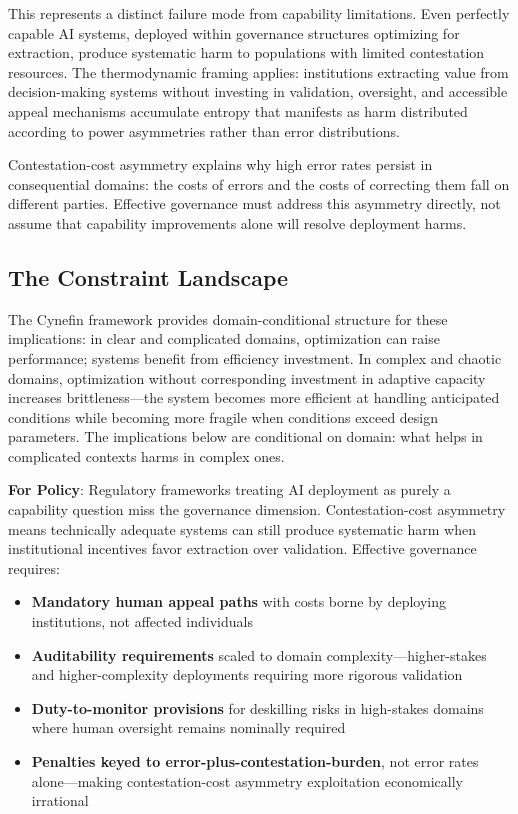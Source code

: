 This represents a distinct failure mode from capability limitations. Even perfectly capable AI systems, deployed within governance structures optimizing for extraction, produce systematic harm to populations with limited contestation resources. The thermodynamic framing applies: institutions extracting value from decision-making systems without investing in validation, oversight, and accessible appeal mechanisms accumulate entropy that manifests as harm distributed according to power asymmetries rather than error distributions.

Contestation-cost asymmetry explains why high error rates persist in consequential domains: the costs of errors and the costs of correcting them fall on different parties. Effective governance must address this asymmetry directly, not assume that capability improvements alone will resolve deployment harms.

\subsection{The Constraint Landscape}

The Cynefin framework provides domain-conditional structure for these implications: in clear and complicated domains, optimization can raise performance; systems benefit from efficiency investment. In complex and chaotic domains, optimization without corresponding investment in adaptive capacity increases brittleness—the system becomes more efficient at handling anticipated conditions while becoming more fragile when conditions exceed design parameters. The implications below are conditional on domain: what helps in complicated contexts harms in complex ones.

\textbf{For Policy}: Regulatory frameworks treating AI deployment as purely a capability question miss the governance dimension. Contestation-cost asymmetry means technically adequate systems can still produce systematic harm when institutional incentives favor extraction over validation. Effective governance requires:
\begin{itemize}
\item \textbf{Mandatory human appeal paths} with costs borne by deploying institutions, not affected individuals
\item \textbf{Auditability requirements} scaled to domain complexity—higher-stakes and higher-complexity deployments requiring more rigorous validation
\item \textbf{Duty-to-monitor provisions} for deskilling risks in high-stakes domains where human oversight remains nominally required
\item \textbf{Penalties keyed to error-plus-contestation-burden}, not error rates alone—making contestation-cost asymmetry exploitation economically irrational
\end{itemize}

